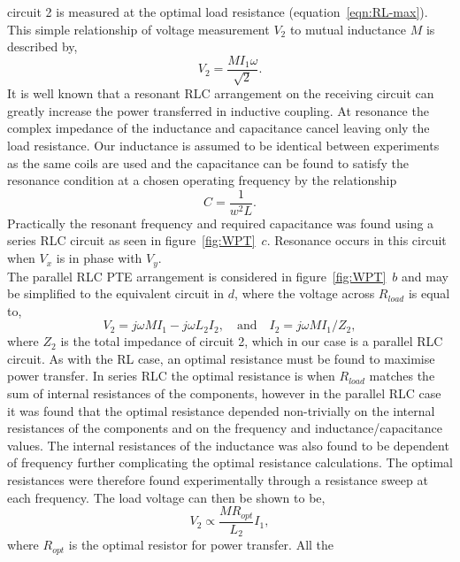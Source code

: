 \documentclass[11pt]{iopart}
\begin{document}
circuit 2 is measured at the optimal load resistance
(equation~\ref{eqn:RL-max}). This simple relationship of voltage
measurement $V_2$ to mutual inductance $M$ is described by,
\begin{equation}
  V_2 = \frac{MI_1\omega}{\sqrt{2}}.
\label{eqn:MVs}
\end{equation}
It is well known that a resonant RLC arrangement on the receiving
circuit can greatly increase the power transferred in inductive
coupling\cite{Hirai2000}.  At resonance the complex impedance of the inductance
and capacitance cancel leaving only the load resistance. Our
inductance is assumed to be identical between experiments as the same
coils are used and the capacitance can be found to satisfy the
resonance condition at a chosen operating frequency by the
relationship
\begin{equation}
  C = \frac{1}{w^2L}.
  \label{eqn:RLC-res}
\end{equation}
Practically the resonant frequency and required capacitance was found
using a series RLC circuit as seen in
figure~\ref{fig:WPT}~$c$. Resonance occurs in this circuit when $V_x$
is in phase with $V_y$.\\
The parallel RLC PTE arrangement is considered in
figure~\ref{fig:WPT}~$b$ and may be simplified to the equivalent
circuit in $d$, where the voltage across $R_{load}$ is equal to,
\begin{equation}
 V_2 = j\omega MI_1 - j\omega L_2I_2,\quad\text{and}\quad
 I_2 = j\omega MI_1 / Z_2 ,
\end{equation}
where $Z_2$ is the total impedance of circuit 2, which in our case is
a parallel RLC circuit.  As with the RL case, an optimal resistance
must be found to
maximise power transfer. In series RLC the optimal resistance is when
$R_{load}$ matches the sum of internal resistances of the components,
however in the parallel RLC case it was found that the optimal
resistance depended non-trivially on the internal resistances of the
components and on the frequency and inductance/capacitance values. The
internal resistances of the inductance was also found to be dependent
of frequency further complicating the optimal resistance calculations.
The optimal resistances were therefore found experimentally
through a resistance sweep at each frequency.
The load voltage can then be shown to be,
\begin{equation}
    V_2 \propto \frac{MR_{opt}}{L_2}I_1,
\label{eqn:RLC-M}
\end{equation}
where $R_{opt}$ is the optimal resistor for power transfer. All the
\end{document}
